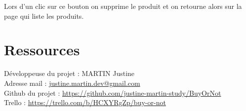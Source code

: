 \documentclass[report]{BetterDocument}
\begin{document}
	Lors d'un clic sur ce bouton on supprime le produit et on retourne alors sur la page qui liste les produits.

	\chapter{Ressources}

	\noindent Développeuse du projet : MARTIN Justine\\
	Adresse mail : \href{mailto:justine.martin.dev@gmail.com}{justine.martin.dev@gmail.com}\\
	Github du projet : \url{https://github.com/justine-martin-study/BuyOrNot}\\
	Trello : \url{https://trello.com/b/HCXYRgZp/buy-or-not}
\end{document}
